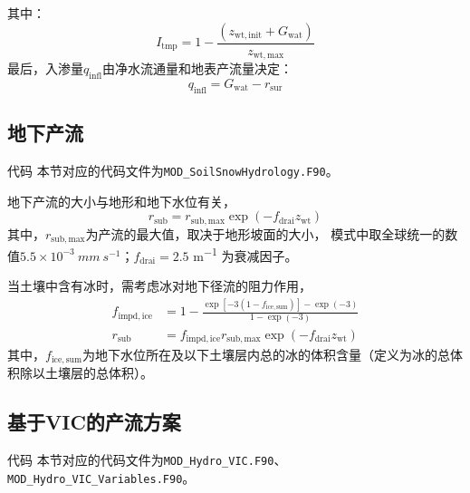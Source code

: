 其中：
\begin{equation}
{I}_{\mathrm{tmp}} = 1 - \frac{\left( z_{\mathrm{wt,init}} + {G}_{\mathrm{wat}} \right)}{z_{\mathrm{wt,max}}}
\end{equation}
最后，入渗量$q_{\mathrm{infl}}$由净水流通量和地表产流量决定：
\begin{equation}
  q_{\mathrm{infl}}={G}_{\mathrm{wat}}-r_{\mathrm{sur}}
\end{equation}






\subsection{地下产流} \label{section:rsub_par}
\begin{mymdframed}{代码}
  本节对应的代码文件为\texttt{MOD\_SoilSnowHydrology.F90}。
\end{mymdframed}

地下产流的大小与地形和地下水位有关\citep{niu2005simple}，
\begin{equation}
  r_{\mathrm{sub}} = r_{\mathrm{sub,max}} \exp \left(-f_{\mathrm{drai}}  z_{\mathrm{wt}}\right)
\end{equation}
其中，$r_{\mathrm{sub,max}}$为产流的最大值，取决于地形坡面的大小，
模式中取全球统一的数值$5.5\times 10^{-3}~\unit{mm~s^{-1}}$；$f_{\mathrm{drai}}=2.5$ \unit{m^{-1}} 为衰减因子。

当土壤中含有冰时，需考虑冰对地下径流的阻力作用，
\begin{equation}
  \begin{aligned}
    f_{\mathrm{impd,ice}} & = 1 - \frac{\exp \left[-3 \left(1-f_{\mathrm{ice,sum}}\right)\right]
    -\exp (-3)}{1-\exp (-3)} \\
    r_{\mathrm{sub}} & = f_{\mathrm{impd,ice}}  r_{\mathrm{sub,max}}
    \exp \left(-f_{\mathrm{drai}}  z_{\mathrm{wt}}\right)
  \end{aligned}
\end{equation}
其中，$f_{\mathrm{ice,sum}}$为地下水位所在及以下土壤层内总的冰的体积含量（定义为冰的总体积除以土壤层的总体积）。

\subsection{基于VIC的产流方案}
\begin{mymdframed}{代码}
  本节对应的代码文件为\texttt{MOD\_Hydro\_VIC.F90}、\texttt{MOD\_Hydro\_VIC\_Variables.F90}。
\end{mymdframed}

